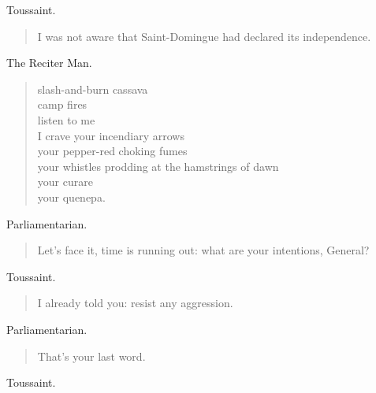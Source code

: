 \documentclass[letterpaper,article,12pt,oneside,notitlepage]{memoir}
\begin{document}
\begin{center}Toussaint.\end{center}

\begin{verse}
I was not aware that Saint-Domingue had declared its independence. \\
\end{verse}

\begin{center}The Reciter Man.\end{center}

\begin{verse}
slash-and-burn cassava \\
camp fires \\
listen to me \\
I crave your incendiary arrows \\
your pepper-red choking fumes \\
your whistles prodding at the hamstrings of dawn \\
your curare \\
your quenepa. \\
\end{verse}

\begin{center}Parliamentarian.\end{center}

\begin{verse}
Let's face it, time is running out: what are your intentions, General? \\
\end{verse}

\clearpage

\begin{center}Toussaint.\end{center}

\begin{verse}
I already told you: resist any aggression. \\
\end{verse}

\begin{center}Parliamentarian.\end{center}

\begin{verse}
That's your last word. \\
\end{verse}

\begin{center}Toussaint.\end{center}
\end{document}

